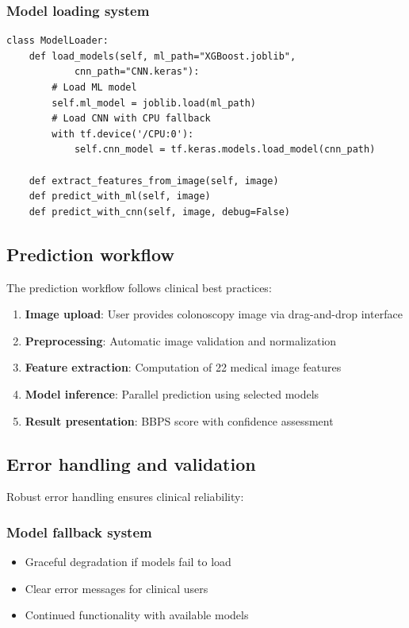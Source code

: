 \documentclass[11pt]{article}
\begin{document}
\subsubsection{Model loading system}
\begin{verbatim}
class ModelLoader:
    def load_models(self, ml_path="XGBoost.joblib",
            cnn_path="CNN.keras"):
        # Load ML model
        self.ml_model = joblib.load(ml_path)
        # Load CNN with CPU fallback
        with tf.device('/CPU:0'):
            self.cnn_model = tf.keras.models.load_model(cnn_path)
    
    def extract_features_from_image(self, image)
    def predict_with_ml(self, image)
    def predict_with_cnn(self, image, debug=False)
\end{verbatim}

\subsection{Prediction workflow}

The prediction workflow follows clinical best practices:

\begin{enumerate}
    \item \textbf{Image upload}: User provides colonoscopy image via drag-and-drop interface
    \item \textbf{Preprocessing}: Automatic image validation and normalization
    \item \textbf{Feature extraction}: Computation of 22 medical image features
    \item \textbf{Model inference}: Parallel prediction using selected models
    \item \textbf{Result presentation}: BBPS score with confidence assessment
\end{enumerate}

\subsection{Error handling and validation}

Robust error handling ensures clinical reliability:

\subsubsection{Model fallback system}
\begin{itemize}
    \item Graceful degradation if models fail to load
    \item Clear error messages for clinical users
    \item Continued functionality with available models
\end{itemize}
\end{document}
